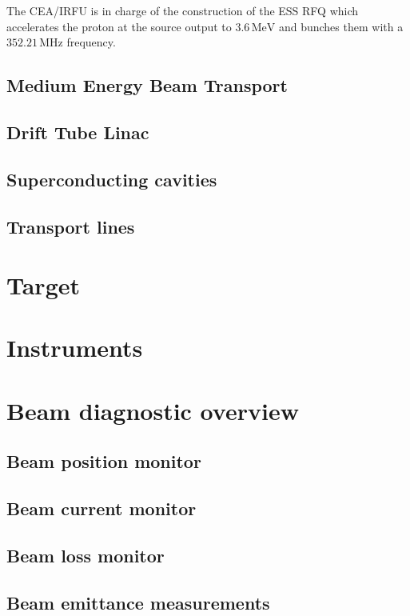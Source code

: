 \begin{refsection}
  The CEA/IRFU is in charge of the construction of the ESS RFQ \cite{ChirpazIPAC2016} which accelerates the proton at the source output to $3.6\,\mathrm{MeV}$ and bunches them with a $352.21\,\mathrm{MHz}$ frequency.

  \subsection{Medium Energy Beam Transport}

  \subsection{Drift Tube Linac}

  \subsection{Superconducting cavities}
  

  \subsection{Transport lines}
  \section{Target}
  \section{Instruments}

  \section{Beam diagnostic overview}
  \subsection{Beam position monitor}
  \subsection{Beam current monitor}
  \subsection{Beam loss monitor}
  \subsection{Beam emittance measurements}

\end{refsection}
